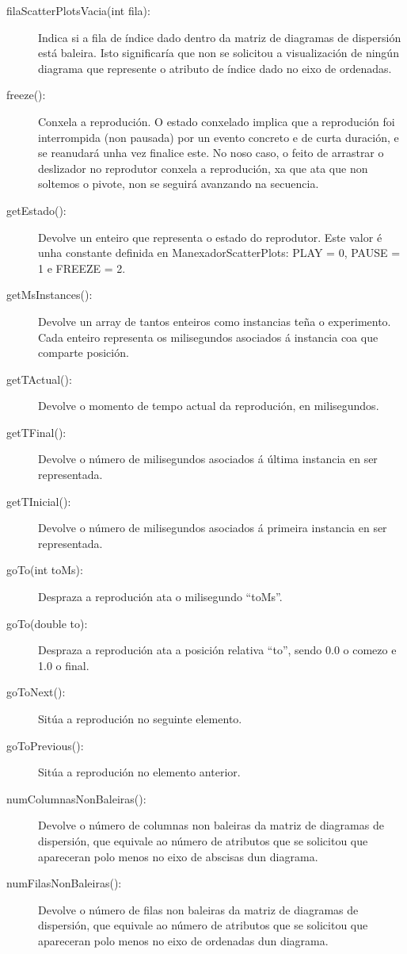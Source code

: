 \begin{description}
\begin{description}
\item[filaScatterPlotsVacia(int fila):] \hfill
Indica si a fila de índice dado dentro da matriz de diagramas de dispersión está baleira. Isto significaría que non se solicitou a visualización de ningún diagrama que represente o atributo de índice dado no eixo de ordenadas.
\item[freeze():] \hfill
Conxela a reprodución. O estado conxelado implica que a reprodución foi interrompida (non pausada) por un evento concreto e de curta duración, e se reanudará unha vez finalice este. No noso caso, o feito de arrastrar o deslizador no reprodutor conxela a reprodución, xa que ata que non soltemos o pivote, non se seguirá avanzando na secuencia.
\item[getEstado():] \hfill
Devolve un enteiro que representa o estado do reprodutor. Este valor é unha constante definida en ManexadorScatterPlots: PLAY = 0, PAUSE = 1 e FREEZE = 2.
\item[getMsInstances():] \hfill
Devolve un array de tantos enteiros como instancias teña o experimento. Cada enteiro representa os milisegundos asociados á instancia coa que comparte posición.
\item[getTActual():] \hfill
Devolve o momento de tempo actual da reprodución, en milisegundos.
\item[getTFinal():] \hfill
Devolve o número de milisegundos asociados á última instancia en ser representada.
\item[getTInicial():] \hfill
Devolve o número de milisegundos asociados á primeira instancia en ser representada.
\item[goTo(int toMs):] \hfill
Despraza a reprodución ata o milisegundo ``toMs''.
\item[goTo(double to):] \hfill
Despraza a reprodución ata a posición relativa ``to'', sendo 0.0 o comezo e 1.0 o final.
\item[goToNext():] \hfill
Sitúa a reprodución no seguinte elemento.
\item[goToPrevious():] \hfill
Sitúa a reprodución no elemento anterior.
\item[numColumnasNonBaleiras():] \hfill
Devolve o número de columnas non baleiras da matriz de diagramas de dispersión, que equivale ao número de atributos que se solicitou que apareceran polo menos no eixo de abscisas dun diagrama.
\item[numFilasNonBaleiras():] \hfill
Devolve o número de filas non baleiras da matriz de diagramas de dispersión, que equivale ao número de atributos que se solicitou que apareceran polo menos no eixo de ordenadas dun diagrama.

\end{description}
\end{description}
